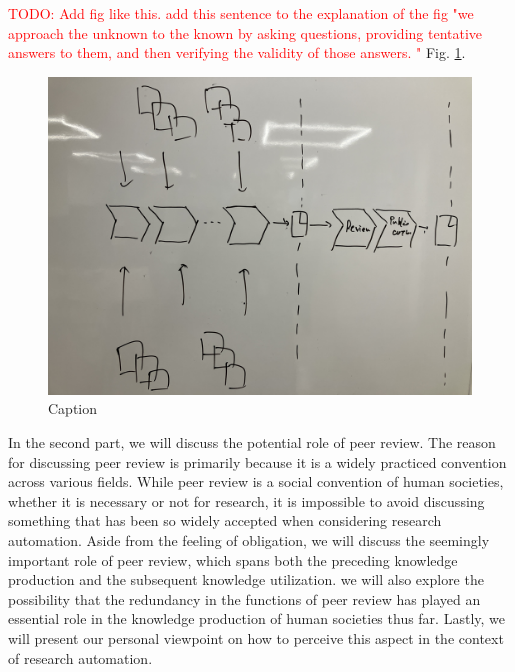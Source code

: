 \documentclass{book}
\begin{document}
\textcolor{red}{TODO: Add fig like this. add this sentence to the explanation of the fig "we approach the unknown to the known by asking questions, providing tentative answers to them, and then verifying the validity of those answers. " } Fig. \ref{fig:research_process}.

\begin{figure}[htb]
    \centering
    \includegraphics[width=\textwidth]{figs/researchprocess.jpg}
    \caption{Caption}
    \label{fig:research_process}
\end{figure}


In the second part, we will discuss the potential role of peer review. The reason for discussing peer review is primarily because it is a widely practiced convention across various fields. While peer review is a social convention of human societies, whether it is necessary or not for research, it is impossible to avoid discussing something that has been so widely accepted when considering research automation. Aside from the feeling of obligation, we will discuss the seemingly important role of peer review, which spans both the preceding knowledge production and the subsequent knowledge utilization. we will also explore the possibility that the redundancy in the functions of peer review has played an essential role in the knowledge production of human societies thus far. Lastly, we will present our personal viewpoint on how to perceive this aspect in the context of research automation.
\end{document}

